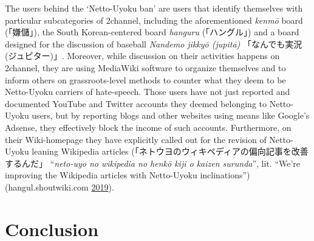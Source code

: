 \documentclass[10pt,british,A4paper,twoside]{memoir}
\begin{document}
The users behind the `Netto-Uyoku ban' are users that identify
themselves with particular subcategories of 2channel, including the
aforementioned \emph{kenmō} board (「嫌儲」), the South Korean-centered
board \emph{hanguru} (「ハングル」) and a board designed for the
discussion of baseball \emph{Nandemo jikkyō (jupitā)} 「なんでも実況
(ジュピター)」. Moreover, while discussion on their activities happens
on 2channel, they are using MediaWiki software to organize
themselves and to inform others on grassroots-level methods to counter what they
deem to be Netto-Uyoku carriers of hate-speech. Those users have not
just reported and documented YouTube and Twitter accounts they deemed
belonging to Netto-Uyoku users, but by reporting blogs and other
websites using means like Google's Adsense, they effectively block the
income of such accounts. Furthermore, on their Wiki-homepage they have
explicitly called out for the revision of Netto-Uyoku leaning Wikipedia
articles (「ネトウヨのウィキペディアの偏向記事を改善するんだ」
``\emph{neto-uyo no wikipedia no henkō kiji o kaizen surunda}'', lit.
``We're improving the Wikipedia articles with Netto-Uyoku
inclinations'') (hangul.shoutwiki.com
\protect\hyperlink{ref-hangul.shoutwiki.com_wikipedia_2019}{2019}).

\section{Conclusion}\label{conclusion-2}
\end{document}
